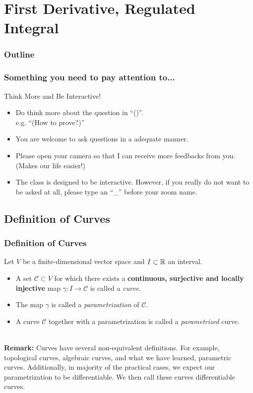 \documentclass[12pt, t]{beamer}
\renewcommand{\emph}[1]{{\color{Turquoise3}\textsl{#1}}}
\newcommand{\nullspace}{~\\[15pt]}
\begin{document}
\section{First Derivative, Regulated Integral}
\begin{frame}
    \frametitle{Outline}
    \begin{spacing}{1.5}
        \tableofcontents[currentsubsection,hideothersubsections,sectionstyle=hide]
    \end{spacing}
\end{frame}

\begin{frame}
    \frametitle{Something you need to pay attention to...}
    Think More and Be Interactive!
    \begin{itemize}
        \item Do think more about the question in ``()''. \\e.g. ``(How to prove?)''
        \item You are welcome to ask questions in a adequate manner.
        \item Please open your camera so that I can receive more feedbacks from you. (Makes our life easier!)
        \item The class is designed to be interactive. However, if you really do not want to be asked at all, please type an ``\_'' before your zoom name.
    \end{itemize}
\end{frame}

\subsection{Definition of Curves}
\begin{frame}
    \frametitle{Definition of Curves}

    Let $V$ be a finite-dimensional vector space and $I\subset\mathbb{R}$ an interval.
    \begin{itemize}
        \item A set $\mathcal{C}\subset V$ for which there exists a \textbf{continuous, surjective and locally injective} map $\gamma:I\to\mathcal{C}$ is called a \emph{curve}.
        \item The map $\gamma$ is called a \emph{parametrization} of $\mathcal{C}$.
        \item A curve $\mathcal{C}$ together with a parametrization is called a \emph{parametrized} curve.
    \end{itemize}
    \nullspace

    \textbf{Remark:} Curves have several non-equivalent definitions. For example, topological curves, algebraic curves, and what we have learned, parametric curves. Additionally, in majority of the practical cases, we expect our parametrization to be differentiable. We then call these curves differentiable curves.
\end{frame}
\end{document}
